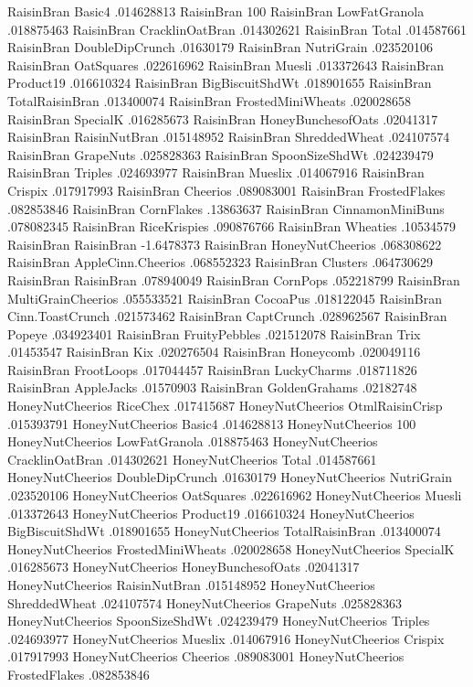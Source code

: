 RaisinBran	Basic4	.014628813
RaisinBran	100%
RaisinBran	LowFatGranola	.018875463
RaisinBran	CracklinOatBran	.014302621
RaisinBran	Total	.014587661
RaisinBran	DoubleDipCrunch	.01630179
RaisinBran	NutriGrain	.023520106
RaisinBran	OatSquares	.022616962
RaisinBran	Muesli	.013372643
RaisinBran	Product19	.016610324
RaisinBran	BigBiscuitShdWt	.018901655
RaisinBran	TotalRaisinBran	.013400074
RaisinBran	FrostedMiniWheats	.020028658
RaisinBran	SpecialK	.016285673
RaisinBran	HoneyBunchesofOats	.02041317
RaisinBran	RaisinNutBran	.015148952
RaisinBran	ShreddedWheat	.024107574
RaisinBran	GrapeNuts	.025828363
RaisinBran	SpoonSizeShdWt	.024239479
RaisinBran	Triples	.024693977
RaisinBran	Mueslix	.014067916
RaisinBran	Crispix	.017917993
RaisinBran	Cheerios	.089083001
RaisinBran	FrostedFlakes	.082853846
RaisinBran	CornFlakes	.13863637
RaisinBran	CinnamonMiniBuns	.078082345
RaisinBran	RiceKrispies	.090876766
RaisinBran	Wheaties	.10534579
RaisinBran	RaisinBran	-1.6478373
RaisinBran	HoneyNutCheerios	.068308622
RaisinBran	AppleCinn.Cheerios	.068552323
RaisinBran	Clusters	.064730629
RaisinBran	RaisinBran	.078940049
RaisinBran	CornPops	.052218799
RaisinBran	MultiGrainCheerios	.055533521
RaisinBran	CocoaPus	.018122045
RaisinBran	Cinn.ToastCrunch	.021573462
RaisinBran	CaptCrunch	.028962567
RaisinBran	Popeye	.034923401
RaisinBran	FruityPebbles	.021512078
RaisinBran	Trix	.01453547
RaisinBran	Kix	.020276504
RaisinBran	Honeycomb	.020049116
RaisinBran	FrootLoops	.017044457
RaisinBran	LuckyCharms	.018711826
RaisinBran	AppleJacks	.01570903
RaisinBran	GoldenGrahams	.02182748
HoneyNutCheerios	RiceChex	.017415687
HoneyNutCheerios	OtmlRaisinCrisp	.015393791
HoneyNutCheerios	Basic4	.014628813
HoneyNutCheerios	100%
HoneyNutCheerios	LowFatGranola	.018875463
HoneyNutCheerios	CracklinOatBran	.014302621
HoneyNutCheerios	Total	.014587661
HoneyNutCheerios	DoubleDipCrunch	.01630179
HoneyNutCheerios	NutriGrain	.023520106
HoneyNutCheerios	OatSquares	.022616962
HoneyNutCheerios	Muesli	.013372643
HoneyNutCheerios	Product19	.016610324
HoneyNutCheerios	BigBiscuitShdWt	.018901655
HoneyNutCheerios	TotalRaisinBran	.013400074
HoneyNutCheerios	FrostedMiniWheats	.020028658
HoneyNutCheerios	SpecialK	.016285673
HoneyNutCheerios	HoneyBunchesofOats	.02041317
HoneyNutCheerios	RaisinNutBran	.015148952
HoneyNutCheerios	ShreddedWheat	.024107574
HoneyNutCheerios	GrapeNuts	.025828363
HoneyNutCheerios	SpoonSizeShdWt	.024239479
HoneyNutCheerios	Triples	.024693977
HoneyNutCheerios	Mueslix	.014067916
HoneyNutCheerios	Crispix	.017917993
HoneyNutCheerios	Cheerios	.089083001
HoneyNutCheerios	FrostedFlakes	.082853846
